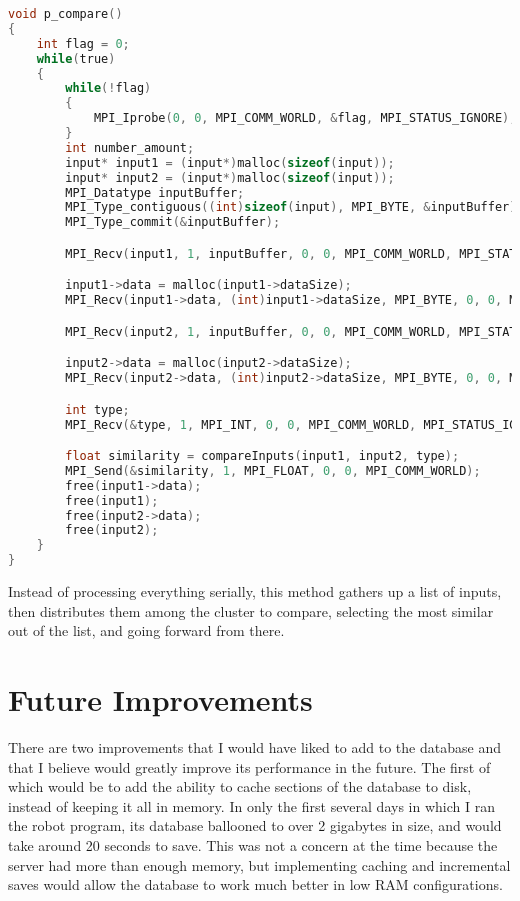 \documentclass{report}
\begin{document}
\begin{lstlisting}[language=C]
void p_compare()
{
    int flag = 0;
    while(true)
    {
        while(!flag)
        {
            MPI_Iprobe(0, 0, MPI_COMM_WORLD, &flag, MPI_STATUS_IGNORE);
        }
        int number_amount;
        input* input1 = (input*)malloc(sizeof(input));
        input* input2 = (input*)malloc(sizeof(input));
        MPI_Datatype inputBuffer;
        MPI_Type_contiguous((int)sizeof(input), MPI_BYTE, &inputBuffer);
        MPI_Type_commit(&inputBuffer);

        MPI_Recv(input1, 1, inputBuffer, 0, 0, MPI_COMM_WORLD, MPI_STATUS_IGNORE);

        input1->data = malloc(input1->dataSize);
        MPI_Recv(input1->data, (int)input1->dataSize, MPI_BYTE, 0, 0, MPI_COMM_WORLD, MPI_STATUS_IGNORE);

        MPI_Recv(input2, 1, inputBuffer, 0, 0, MPI_COMM_WORLD, MPI_STATUS_IGNORE);

        input2->data = malloc(input2->dataSize);
        MPI_Recv(input2->data, (int)input2->dataSize, MPI_BYTE, 0, 0, MPI_COMM_WORLD, MPI_STATUS_IGNORE);

        int type;
        MPI_Recv(&type, 1, MPI_INT, 0, 0, MPI_COMM_WORLD, MPI_STATUS_IGNORE);

        float similarity = compareInputs(input1, input2, type);
        MPI_Send(&similarity, 1, MPI_FLOAT, 0, 0, MPI_COMM_WORLD);
        free(input1->data);
        free(input1);
        free(input2->data);
        free(input2);
    }
}
\end{lstlisting}
Instead of processing everything serially, this method gathers up a list of inputs, then distributes them among the cluster to compare, selecting the most similar out of the list, and going forward from there.

\section{Future Improvements}
There are two improvements that I would have liked to add to the database and that I believe would greatly improve its performance in the future. The first of which would be to add the ability to cache sections of the database to disk, instead of keeping it all in memory. In only the first several days in which I ran the robot program, its database ballooned to over 2 gigabytes in size, and would take around 20 seconds to save. This was not a concern at the time because the server had more than enough memory, but implementing caching and incremental saves would allow the database to work much better in low RAM configurations. 
\end{document}

